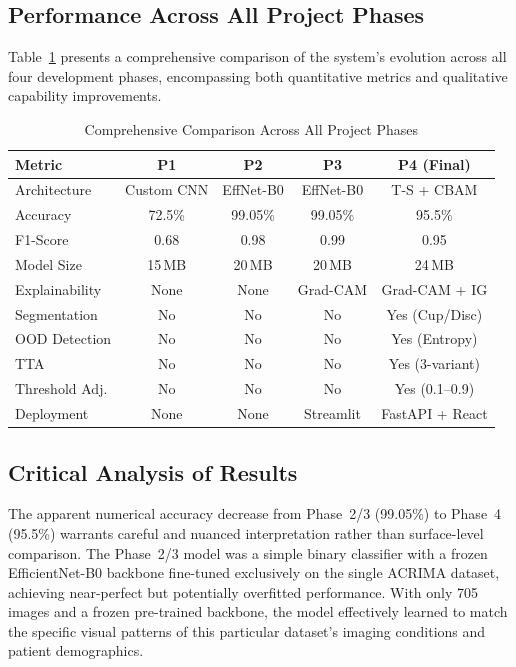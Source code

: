 \documentclass[conference]{IEEEtran}
\begin{document}
\subsection{Performance Across All Project Phases}
Table~\ref{tab:comparison} presents a comprehensive comparison of the system's evolution across all four development phases, encompassing both quantitative metrics and qualitative capability improvements.

\begin{table}[h]
\centering
\caption{Comprehensive Comparison Across All Project Phases}
\label{tab:comparison}
\renewcommand{\arraystretch}{1.2}
\begin{tabular}{@{}lcccc@{}}
\toprule
\textbf{Metric} & \textbf{P1} & \textbf{P2} & \textbf{P3} & \textbf{P4 (Final)} \\
\midrule
Architecture     & Custom CNN       & EffNet-B0       & EffNet-B0       & T-S + CBAM        \\
Accuracy         & 72.5\%           & 99.05\%         & 99.05\%         & 95.5\%            \\
F1-Score         & 0.68             & 0.98            & 0.99            & 0.95              \\
Model Size       & 15\,MB           & 20\,MB          & 20\,MB          & 24\,MB            \\
Explainability   & None             & None            & Grad-CAM        & Grad-CAM + IG     \\
Segmentation     & No               & No              & No              & Yes (Cup/Disc)    \\
OOD Detection    & No               & No              & No              & Yes (Entropy)     \\
TTA              & No               & No              & No              & Yes (3-variant)   \\
Threshold Adj.   & No               & No              & No              & Yes (0.1--0.9)    \\
Deployment       & None             & None            & Streamlit       & FastAPI + React   \\
\bottomrule
\end{tabular}
\end{table}

\subsection{Critical Analysis of Results}
The apparent numerical accuracy decrease from Phase~2/3 (99.05\%) to Phase~4 (95.5\%) warrants careful and nuanced interpretation rather than surface-level comparison. The Phase~2/3 model was a simple binary classifier with a frozen EfficientNet-B0 backbone fine-tuned exclusively on the single ACRIMA dataset, achieving near-perfect but potentially overfitted performance. With only 705 images and a frozen pre-trained backbone, the model effectively learned to match the specific visual patterns of this particular dataset's imaging conditions and patient demographics.
\end{document}
